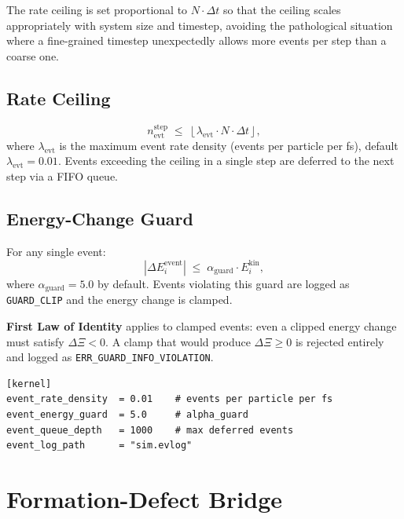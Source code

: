 \documentclass[11pt,a4paper]{article}
\newcommand{\Rec}{\Xi}
\begin{document}
The rate ceiling is set proportional to $N \cdot \Delta t$ so that the
ceiling scales appropriately with system size and timestep, avoiding the
pathological situation where a fine-grained timestep unexpectedly allows
more events per step than a coarse one.

\subsection{Rate Ceiling}

\[
  n_{\mathrm{evt}}^{\mathrm{step}} \;\leq\; \left\lfloor
    \lambda_{\mathrm{evt}} \cdot N \cdot \Delta t
  \right\rfloor ,
\]
where $\lambda_{\mathrm{evt}}$ is the maximum event rate density
(events per particle per fs), default $\lambda_{\mathrm{evt}} = 0.01$.
Events exceeding the ceiling in a single step are deferred to the next step
via a FIFO queue.

\subsection{Energy-Change Guard}

For any single event:
\[
  \left|\Delta E_i^{\mathrm{event}}\right| \;\leq\;
  \alpha_{\mathrm{guard}} \cdot E_i^{\mathrm{kin}} ,
\]
where $\alpha_{\mathrm{guard}} = 5.0$ by default.  Events violating this
guard are logged as \texttt{GUARD\_CLIP} and the energy change is clamped.

\begin{smlaw}
\textbf{First Law of Identity} applies to clamped events: even a clipped
energy change must satisfy $\Delta\Rec < 0$.  A clamp that would produce
$\Delta\Rec \geq 0$ is rejected entirely and logged as
\texttt{ERR\_GUARD\_INFO\_VIOLATION}.
\end{smlaw}

\begin{lstlisting}[language={}, caption={Event limiter configuration block.}]
[kernel]
event_rate_density  = 0.01    # events per particle per fs
event_energy_guard  = 5.0     # alpha_guard
event_queue_depth   = 1000    # max deferred events
event_log_path      = "sim.evlog"
\end{lstlisting}

\section{Formation-Defect Bridge}\label{sec:formation}
\end{document}
